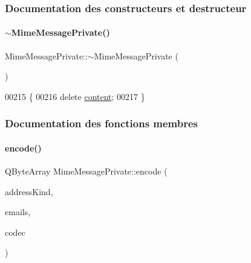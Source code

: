 \subsubsection{Documentation des constructeurs et destructeur}
\mbox{\label{class_simple_mail_1_1_mime_message_private_a93ed259a5e3be9645688f2887f5559ed}} 
\paragraph{\texorpdfstring{$\sim$\+Mime\+Message\+Private()}{~MimeMessagePrivate()}}
{\footnotesize\ttfamily Mime\+Message\+Private\+::$\sim$\+Mime\+Message\+Private (\begin{DoxyParamCaption}{ }\end{DoxyParamCaption})}


\begin{DoxyCode}
00215 \{
00216     \textcolor{keyword}{delete} \hyperlink{class_simple_mail_1_1_mime_message_private_a31f25b224455b2e8dafbdc1d6cfed3de}{content};
00217 \}
\end{DoxyCode}


\subsubsection{Documentation des fonctions membres}
\mbox{\label{class_simple_mail_1_1_mime_message_private_a44bd454950e1fd6b48a29d2a7b11ca33}} 
\paragraph{\texorpdfstring{encode()}{encode()}}
{\footnotesize\ttfamily Q\+Byte\+Array Mime\+Message\+Private\+::encode (\begin{DoxyParamCaption}\item[{const Q\+Byte\+Array \&}]{address\+Kind,  }\item[{const Q\+List$<$ \hyperlink{class_simple_mail_1_1_email_address}{Email\+Address} $>$ \&}]{emails,  }\item[{\hyperlink{class_simple_mail_1_1_mime_part_ae67a2f5406958b95b18bf31a7bbeb5c9}{Mime\+Part\+::\+Encoding}}]{codec }\end{DoxyParamCaption})\hspace{0.3cm}{\ttfamily [static]}}



